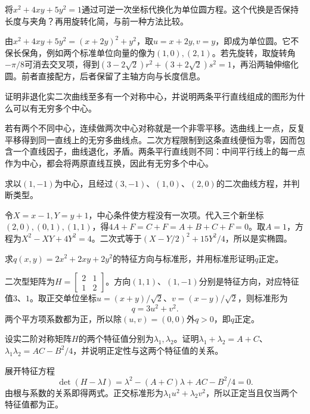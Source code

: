 将\(x^2+4xy+5y^2=1\)通过可逆一次坐标代换化为单位圆方程。这个代换是否保持长度与夹角？再用旋转化简，与前一种方法比较。
\par
\solutionanswer
由\(x^2+4xy+5y^2=(x+2y)^2+y^2\)，取\(u=x+2y,v=y\)，即成为单位圆。它不保长保角，例如两个标准单位向量的像为\((1,0),(2,1)\)。若先旋转，取旋转角\(-\pi/8\)可消去交叉项，得到\((3-2\sqrt2)r^2+(3+2\sqrt2)s^2=1\)，再沿两轴伸缩化圆。前者直接配方，后者保留了主轴方向与长度信息。


证明非退化实二次曲线至多有一个对称中心，并说明两条平行直线组成的图形为什么可以有无穷多个中心。
\par
\solutionanswer
若有两个不同中心，连续做两次中心对称就是一个非零平移。选曲线上一点，反复平移得到同一直线上的无穷多曲线点。二次方程限制到这条直线便恒为零，因而包含一个直线因子，曲线退化，矛盾。两条平行直线则不同：中间平行线上的每一点作为中心，都会将两原直线互换，因此有无穷多个中心。


求以\((1,-1)\)为中心，且经过\((3,-1)\)、\((1,0)\)、\((2,0)\)的二次曲线方程，并判断类型。
\par
\solutionanswer
令\(X=x-1,Y=y+1\)，中心条件使方程没有一次项。代入三个新坐标\((2,0),(0,1),(1,1)\)，得\(4A+F=C+F=A+B+C+F=0\)。取\(A=1\)，方程为\(X^2-XY+4Y^2=4\)。二次式等于\((X-Y/2)^2+15Y^2/4\)，所以是实椭圆。


求\(q(x,y)=2x^2+2xy+2y^2\)的特征方向与标准形，并用标准形证明\(q\)正定。
\par
\solutionanswer
二次型矩阵为\(H=\begin{bmatrix}2&1\\1&2\end{bmatrix}\)。方向\((1,1)\)、\((1,-1)\)分别是特征方向，对应特征值\(3\)、\(1\)。取正交单位坐标\(u=(x+y)/\sqrt2\)、\(v=(x-y)/\sqrt2\)，则标准形为
\[
q=3u^2+v^2.
\]
两个平方项系数都为正，所以除\((u,v)=(0,0)\)外\(q>0\)，即\(q\)正定。


设实二阶对称矩阵\(H\)的两个特征值分别为\(\lambda_1,\lambda_2\)。证明\(\lambda_1+\lambda_2=A+C\)、\(\lambda_1\lambda_2=AC-B^2/4\)，并说明正定性与这两个特征值的关系。
\par
\solutionanswer
展开特征方程
\[
\det(H-\lambda I)=\lambda^2-(A+C)\lambda+AC-B^2/4=0.
\]
由根与系数的关系即得两式。正交标准形为\(\lambda_1u^2+\lambda_2v^2\)，所以正定当且仅当两个特征值都为正。


